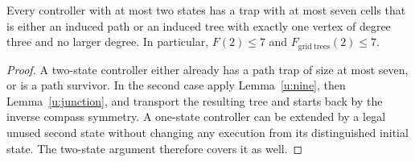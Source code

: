 

\begin{proposition}\label{u:upper}
Every controller with at most two states has a trap with at most
seven cells that is either an induced path or an induced tree with
exactly one vertex of degree three and no larger degree. In particular,
$F(2)\le7$ and $F_{\mathrm{grid\ trees}}(2)\le7$.
\end{proposition}

\begin{proof}
A two-state controller either already has a path trap of size at
most seven, or is a path survivor. In the second case apply
Lemma~\ref{u:nine}, then Lemma~\ref{u:junction}, and transport the
resulting tree and starts back by the inverse compass symmetry.
A one-state controller can be extended by a legal unused second
state without changing any execution from its distinguished initial
state. The two-state argument therefore covers it as well.
\end{proof}
